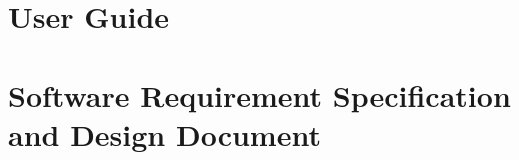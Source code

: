 \documentclass[a4paper]{report}
\begin{document}


\chapter{User Guide}

 



\printbibliography


\chapter{Software Requirement Specification and Design Document}
\begin{refsection}

\printbibliography
\end{refsection}
\end{document}
